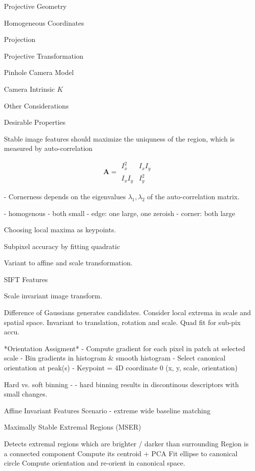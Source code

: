 \begin{section}
\begin{subsubsection}
\begin{subsubsection}
\begin{subsubsection}
\begin{section}{Projective Geometry}
\begin{subsection}{Homogeneous Coordinates}
\begin{subsubsection}
{\begin{subsubsection}{Projection}
\begin{subsubsection}{Projective Transformation}
\begin{subsection}
\begin{subsubsection}
\begin{subsubsection}
\begin{subsubsection}
{\begin{subsubsection}
\begin{subsection}
\begin{subsection} {Pinhole Camera Model}
\begin{subsection} {Camera Intrinsic $K$}
\begin{subsection}
\begin{subsection}
\begin{subsubsection}{Other Considerations}
{\begin{subsection}
\begin{subsubsection}{Desirable Properties}
\begin{section}
\begin{subsection}
Stable image features should maximize the uniquness of the region, which is measured by auto-correlation 

$$ \mathbf{A} =  \begin{matrix} I_x^2 &  I_xI_y \\
I_xI_y & I_y^2
\end{matrix} $$

- Cornerness depends on the eigenvalues $\lambda_1,\lambda_2$ of the auto-correlation matrix.

- homogenous - both small
- edge: one large, one zeroish
- corner: both large

Choosing local maxima as keypoints. 

Subpixel accuracy by fitting quadratic 

Variant to affine and scale transformation.

\begin{subsection} SIFT Features

Scale invariant image transform.

Difference of Gaussians generates candidates. 
Consider local extrema in scale and spatial space.
Invariant to translation, rotation and scale.
Quad fit for sub-pix accu.

*Orientation Assigment*
- Compute gradient for each pixel in patch at selected scale
- Bin gradients in histogram & smooth histogram
- Select canonical orientation at peak(s)
- Keypoint = 4D coordinate 0 (x, y, scale, orientation)

Hard vs. soft binning -
- hard binning results in discontinous descriptors with small changes.

\begin{subsection} Affine Invariant Features
Scenario - extreme wide baseline matching

Maximally Stable Extremal Regions (MSER)

Detects extremal regions which are brighter / darker than surrounding
Region is a connected component
Compute its centroid + PCA
Fit ellipse to canonical circle
Compute orientation and re-orient in canonical space.


\end{subsection}
\end{subsection}
\end{subsection}
\end{section}
\end{subsubsection}
\end{subsection}}
\end{subsubsection}
\end{subsection}
\end{subsection}
\end{subsection}
\end{subsection}
\end{subsection}
\end{subsubsection}}
\end{subsubsection}
\end{subsubsection}
\end{subsubsection}
\end{subsection}
\end{subsubsection}
\end{subsubsection}}
\end{subsubsection}
\end{subsection}
\end{section}
\end{subsubsection}
\end{subsubsection}
\end{subsubsection}
\end{section}
